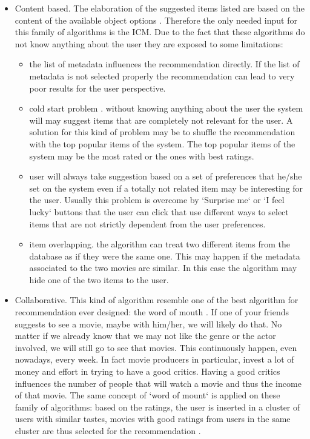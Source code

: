 \begin{itemize}
\item Content based. The elaboration of the suggested items listed are based on the content of the available object options \cite{content-based-recommendation-systems}. Therefore the only needed input for this family of algorithms is the \ac{ICM}. Due to the fact that these algorithms do not know anything about the user they are exposed to some limitations:
  \begin{itemize}
  \item the list of metadata influences the recommendation directly. If the list of metadata is not selected properly the recommendation can lead to very poor results for the user perspective.
  \item cold start problem \cite{cold-start-recommendations}. without knowing anything about the user the system will may suggest items that are completely not relevant for the user. A solution for this kind of problem may be to shuffle the recommendation with the top popular items of the system. The top popular items of the system may be the most rated or the ones with best ratings.
  \item user will always take suggestion based on a set of preferences that he/she set on the system even if a totally not related item may be interesting for the user. Usually this problem is overcome by `Surprise me` or `I feel lucky` buttons that the user can click that use different ways to select items that are not strictly dependent from the user preferences.
  \item item overlapping. the algorithm can treat two different items from the database as if they were the same one. This may happen if the metadata associated to the two movies are similar. In this case the algorithm may hide one of the two items to the user.
  \end{itemize}
\item Collaborative. This kind of algorithm resemble one of the best algorithm for recommendation ever designed: the word of mouth \cite{social-information-filtering}. If one of your friends suggests to see a movie, maybe with him/her, we will likely do that. No matter if we already know that we may not like the genre or the actor involved, we will still go to see that movies. This continuously happen, even nowadays, every week. In fact movie producers in particular, invest a lot of money and effort in trying to have a good critics. Having a good critics influences the number of people that will watch a movie and thus the income of that movie. The same concept of `word of mount` is applied on these family of algorithms: based on the ratings, the user is inserted in a cluster of users with similar tastes, movies with good ratings from users in the same cluster are thus selected for the recommendation \cite{using-collaborative-filtering}.

\end{itemize}
